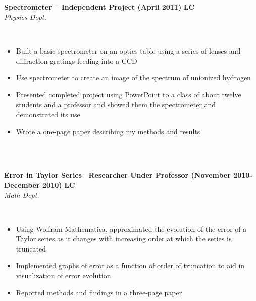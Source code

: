 \documentclass{article}
\begin{document}
\phantom \\
\phantom \\
%
%
%
%
\begin{vwcol}[widths={0.8,0.2}, sep=.8cm, justify=flush, rule=0pt, indent=0em]
\noindent \textbf{Spectrometer – Independent Project (April 2011)}
\newpage
\noindent \textbf{LC}\\
\noindent \emph{Physics Dept.}
\end{vwcol}
\phantom \\
\begin{itemize}
\item Built a basic spectrometer on an optics table using a series of lenses and diffraction gratings feeding into a CCD
\item Use spectrometer to create an image of the spectrum of unionized hydrogen
\item Presented completed project using PowerPoint to a class of about twelve students and a professor and showed them the spectrometer and demonstrated its use
\item Wrote a one-page paper describing my methods and results
\end{itemize}
\phantom \\
\phantom \\
%
%
%
%
\begin{vwcol}[widths={0.8,0.2}, sep=.8cm, justify=flush, rule=0pt, indent=0em]
\noindent \textbf{Error in Taylor Series– Researcher Under Professor (November 2010-December 2010)}
\newpage
\noindent \textbf{LC}\\
\noindent \emph{Math Dept.}
\end{vwcol}
\phantom \\
\begin{itemize}
\item Using Wolfram Mathematica, approximated the evolution of the error of a Taylor series as it changes with increasing order at which the series is truncated
\item Implemented graphs of error as a function of order of truncation to aid in visualization of error evolution
\item Reported methods and findings in a three-page paper
\end{itemize}
\phantom \\
\phantom \\
%
%
%
%
\par
\phantom \\
\phantom \\
\end{document}
